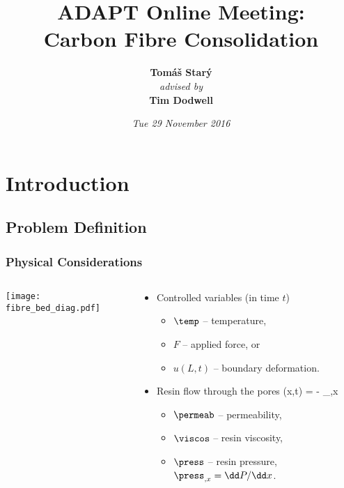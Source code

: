 \documentclass[compress]{beamer}%
\institute{\footnotesize 
  College of Engineering, Mathematics and Physical Sciences  \\[1ex]
}
\title{ADAPT Online Meeting:\\ Carbon Fibre Consolidation}
\author{ \textbf{\Large Tom\'a\v s Star\'y} \\ {\footnotesize\it advised by} \\[1ex] \textbf{\Large Tim Dodwell}
}
\date{
\it  Tue 29 November 2016
}
\newenvironment{myalign}
{\align\color{\notcolor}}
{
  \nonumber
  \endalign
  \vspace{-1em}
}
\begin{document}
 
\frame{\titlepage}

\section[Outline]{}
\frame{\tableofcontents}


\section{Introduction}

\subsection{Problem Definition}

\begin{frame}[label=A]
  \frametitle{Physical Considerations}
  \begin{columns}
    \begin{column}{0.4\textwidth}
      \texttt{[image: fibre\_bed\_diag.pdf]}
    \end{column}
    \begin{column}{0.6\textwidth}
      \begin{itemize}
      \item Controlled variables (in time $t$)
        \begin{itemize}
        \item $\temp$ -- temperature,
        \item $F$ -- applied force, or
        \item $u(L,t)$ -- boundary deformation.
        \end{itemize}
        
      \item Resin flow through the pores
        \begin{myalign}
          \flow(x,t) = - \press_{,x} 
        \end{myalign}
        \begin{itemize}
        \item $\permeab$ -- permeability,
        \item $\viscos$ -- resin viscosity,
        \item $\press$ -- resin pressure, $\press_{,x}= \dd P/\dd x$.
        \end{itemize}


\end{itemize}
\end{column}
\end{columns}
\end{frame}
\end{document}
